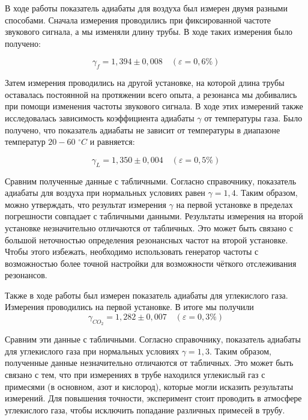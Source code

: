 \documentclass[a4paper,12pt]{article} %
\begin{document}
В ходе работы показатель адиабаты для воздуха был измерен двумя разными способами. Сначала измерения проводились при фиксированной частоте звукового сигнала, а мы изменяли длину трубы. В ходе таких измерения было получено:

\[ \boxed{\gamma_f = 1,394 \pm 0,008}\quad (\varepsilon=0,6\%) \]

Затем измерения проводились на другой установке, на которой длина трубы оставалась постоянной на протяжении всего опыта, а резонанса мы добивались при помощи изменения частоты звукового сигнала. В ходе этих измерений также исследовалась зависимость коэффициента адиабаты $ \gamma $ от температуры газа. Было получено, что показатель адиабаты не зависит от температуры в диапазоне температур $ 20-60 $ $ ^\circ C $ и равняется:

\[ \boxed{\gamma_L = 1,350 \pm 0,004}\quad (\varepsilon=0,5\%) \]

Сравним полученные данные с табличными. Согласно справочнику, показатель адиабаты для воздуха при нормальных условиях равен \underline{$ \gamma = 1,4 $}. Таким образом, можно утверждать, что результат измерения $ \gamma $ на первой установке в пределах погрешности совпадает с табличными данными. Результаты измерения на второй установке незначительно отличаются от табличных. Это может быть связано с большой неточностью определения резонансных частот на второй установке. Чтобы этого избежать, необходимо использовать генератор частоты с возможностью более точной настройки для возможности чёткого отслеживания резонансов.

Также в ходе работы был измерен показатель адиабаты для углекислого газа. Измерения проводились на первой установке. В итоге мы получили \[ \boxed{\gamma_{CO_2} = 1,282\pm0,007}\quad (\varepsilon=0,3\%) \]

Сравним эти данные с табличными. Согласно справочнику, показатель адиабаты для углекислого газа при нормальных условиях \underline{$ \gamma = 1,3 $}. Таким образом, полученные данные незначительно отличаются от табличных. Это может быть связано с тем, что при измерениях в трубе находился углекислый газ с примесями (в основном, азот и кислород), которые могли исказить результаты измерений. Для повышения точности, эксперимент стоит проводить в атмосфере углекислого газа, чтобы исключить попадание различных примесей в трубу.
\end{document}
